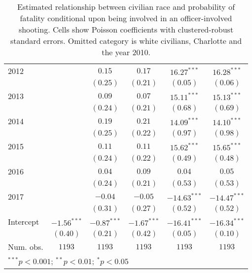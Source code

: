 \begin{table}[ht!]
\begin{center}
\begin{tabular}{l c c c c c}
2012                       &               & $0.15$        & $0.17$        & $16.27^{***}$  & $16.28^{***}$  \\
                           &               & $(0.25)$      & $(0.21)$      & $(0.05)$       & $(0.06)$       \\
2013                       &               & $0.09$        & $0.07$        & $15.11^{***}$  & $15.13^{***}$  \\
                           &               & $(0.24)$      & $(0.21)$      & $(0.68)$       & $(0.69)$       \\
2014                       &               & $0.19$        & $0.21$        & $14.09^{***}$  & $14.10^{***}$  \\
                           &               & $(0.25)$      & $(0.22)$      & $(0.97)$       & $(0.98)$       \\
2015                       &               & $0.11$        & $0.11$        & $15.62^{***}$  & $15.65^{***}$  \\
                           &               & $(0.24)$      & $(0.22)$      & $(0.49)$       & $(0.48)$       \\
2016                       &               & $0.04$        & $0.09$        & $0.04$         & $0.05$         \\
                           &               & $(0.24)$      & $(0.21)$      & $(0.53)$       & $(0.53)$       \\
2017                       &               & $-0.04$       & $-0.05$       & $-14.63^{***}$ & $-14.47^{***}$ \\
                           &               & $(0.31)$      & $(0.27)$      & $(0.52)$       & $(0.52)$       \\
Intercept                  & $-1.56^{***}$ & $-0.87^{***}$ & $-1.67^{***}$ & $-16.41^{***}$ & $-16.34^{***}$ \\
                           & $(0.40)$      & $(0.21)$      & $(0.42)$      & $(0.05)$       & $(0.10)$       \\
\midrule
Num. obs.                  & $1193$        & $1193$        & $1193$        & $1193$         & $1193$         \\
\bottomrule
\multicolumn{6}{l}{\scriptsize{$^{***}p<0.001$; $^{**}p<0.01$; $^{*}p<0.05$}}
\end{tabular}
\caption{Estimated relationship between civilian race and probability of fatality conditional upon being involved in an officer-involved shooting. Cells show Poisson coefficients with clustered-robust standard errors. Omitted category is white civilians, Charlotte and the year 2010.}
\label{tab:poisson_FE}
\end{center}
\end{table}
